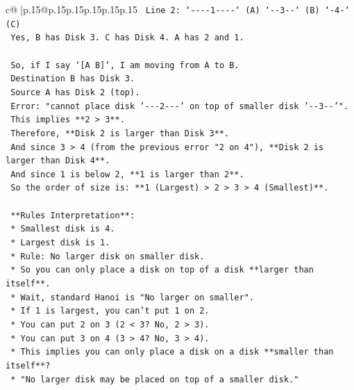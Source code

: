 \documentclass{article}
\begin{document}
{\begin{supertabular}{c@{$\;$}|p{.15\linewidth}@{}p{.15\linewidth}p{.15\linewidth}p{.15\linewidth}p{.15\linewidth}p{.15\linewidth}}
{{{\texttt{                Line 2: `{-}{-}{-}{-}1{-}{-}{-}{-}` (A) `{-}{-}3{-}{-}` (B) `{-}4{-}` (C)} \\
\texttt{                Yes, B has Disk 3. C has Disk 4. A has 2 and 1.} \\
\\ 
\texttt{                So, if I say `{[}A B{]}`, I am moving from A to B.} \\
\texttt{                Destination B has Disk 3.} \\
\texttt{                Source A has Disk 2 (top).} \\
\texttt{                Error: "cannot place disk '{-}{-}{-}2{-}{-}{-}' on top of smaller disk '{-}{-}3{-}{-}'".} \\
\texttt{                This implies **2 > 3**.} \\
\texttt{                Therefore, **Disk 2 is larger than Disk 3**.} \\
\texttt{                And since 3 > 4 (from the previous error "2 on 4"), **Disk 2 is larger than Disk 4**.} \\
\texttt{                And since 1 is below 2, **1 is larger than 2**.} \\
\texttt{                So the order of size is: **1 (Largest) > 2 > 3 > 4 (Smallest)**.} \\
\\ 
\texttt{                **Rules Interpretation**:} \\
\texttt{                *   Smallest disk is 4.} \\
\texttt{                *   Largest disk is 1.} \\
\texttt{                *   Rule: No larger disk on smaller disk.} \\
\texttt{                *   So you can only place a disk on top of a disk **larger than itself**.} \\
\texttt{                *   Wait, standard Hanoi is "No larger on smaller".} \\
\texttt{                *   If 1 is largest, you can't put 1 on 2.} \\
\texttt{                *   You can put 2 on 3 (2 < 3? No, 2 > 3).} \\
\texttt{                *   You can put 3 on 4 (3 > 4? No, 3 > 4).} \\
\texttt{                *   This implies you can only place a disk on a disk **smaller than itself**?} \\
\texttt{                *   "No larger disk may be placed on top of a smaller disk."} \\
}}}
\end{supertabular}}
\end{document}
